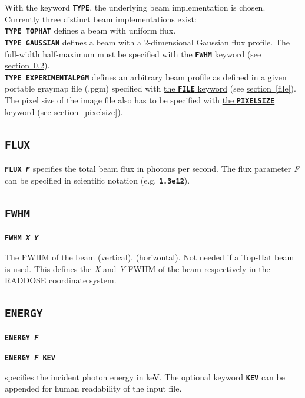 \documentclass[a4paper]{article}
\newcommand{\Keyword}[1]{\texttt{\textbf{#1}}\xspace}
\newcommand{\SB}{\\[0.2em]}
\begin{document}
With the keyword \Keyword{TYPE}, the underlying beam implementation is chosen.
Currently three distinct beam implementations exist:\SB

\noindent \Keyword{TYPE TOPHAT} defines a beam with uniform flux.\SB

\noindent \Keyword{TYPE GAUSSIAN} defines a beam with a 2-dimensional Gaussian flux profile. The full-width half-maximum must be specified with \hyperref[beamfwhm]{the \Keyword{FWHM} keyword} (see \hyperref[beamfwhm]{section~\ref*{beamfwhm}}).\SB

\noindent \Keyword{TYPE EXPERIMENTALPGM} defines an arbitrary beam profile as defined in a given portable graymap file (.pgm) specified with \hyperref[file]{the \Keyword{FILE} keyword} (see \hyperref[file]{section~\ref*{file}}). The pixel size of the image file also has to be specified with \hyperref[pixelsize]{the \Keyword{PIXELSIZE} keyword} (see \hyperref[pixelsize]{section~\ref*{pixelsize}}).\SB


\subsection{\Keyword{FLUX}}
\label{flux}

\noindent \Keyword{FLUX \textit{F}} specifies the total beam flux in photons per second. The flux parameter \textit{F} can be specified in scientific notation (e.g. \Keyword{1.3e12}).


\subsection{\Keyword{FWHM}}

\label{beamfwhm}
\noindent \Keyword{FWHM \textit{X Y}}

The FWHM of the beam (vertical), (horizontal). Not needed if a Top-Hat beam is used.
This defines the \textit{X} and \textit{Y} FWHM of the beam respectively in the RADDOSE coordinate system.


\subsection{\Keyword{ENERGY}}

\noindent \Keyword{ENERGY \textit{F}}

\noindent \Keyword{ENERGY \textit{F} KEV}

specifies the incident photon energy in keV. The optional keyword \Keyword{KEV} can be appended for human readability of the input file.
\end{document}
